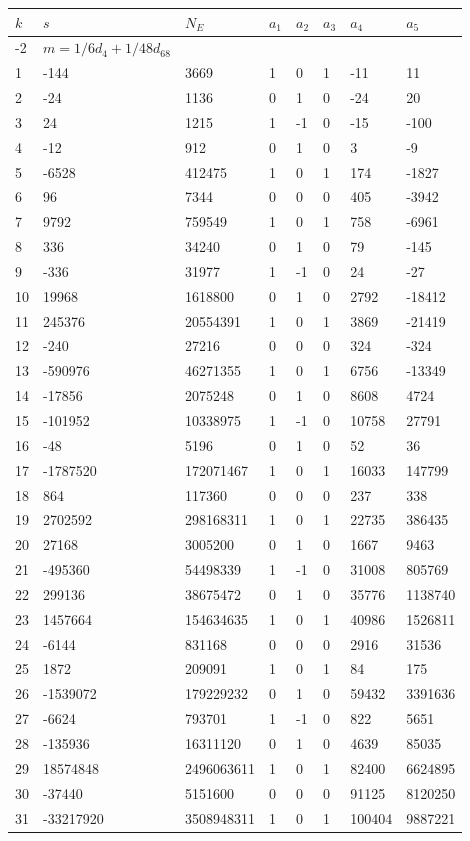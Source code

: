 \documentclass{amsart}
\begin{document}
\begin{longtable}{|l|l|l|lllll|}
\hline
$k$ & $s$ & $N_E$ & $a_1$ & $a_2$ & $a_3$ & $a_4$ & $a_5$\\
\hline
-2&$m=1/6d_{4}+1/48d_{68}$&&\multicolumn{5}{c|}{}\\
1&-144&3669&1&0&1&-11&11\\
2&-24&1136&0&1&0&-24&20\\
3&24&1215&1&-1&0&-15&-100\\
4&-12&912&0&1&0&3&-9\\
5&-6528&412475&1&0&1&174&-1827\\
6&96&7344&0&0&0&405&-3942\\
7&9792&759549&1&0&1&758&-6961\\
8&336&34240&0&1&0&79&-145\\
9&-336&31977&1&-1&0&24&-27\\
10&19968&1618800&0&1&0&2792&-18412\\
11&245376&20554391&1&0&1&3869&-21419\\
12&-240&27216&0&0&0&324&-324\\
13&-590976&46271355&1&0&1&6756&-13349\\
14&-17856&2075248&0&1&0&8608&4724\\
15&-101952&10338975&1&-1&0&10758&27791\\
16&-48&5196&0&1&0&52&36\\
17&-1787520&172071467&1&0&1&16033&147799\\
18&864&117360&0&0&0&237&338\\
19&2702592&298168311&1&0&1&22735&386435\\
20&27168&3005200&0&1&0&1667&9463\\
21&-495360&54498339&1&-1&0&31008&805769\\
22&299136&38675472&0&1&0&35776&1138740\\
23&1457664&154634635&1&0&1&40986&1526811\\
24&-6144&831168&0&0&0&2916&31536\\
25&1872&209091&1&0&1&84&175\\
26&-1539072&179229232&0&1&0&59432&3391636\\
27&-6624&793701&1&-1&0&822&5651\\
28&-135936&16311120&0&1&0&4639&85035\\
29&18574848&2496063611&1&0&1&82400&6624895\\
30&-37440&5151600&0&0&0&91125&8120250\\
31&-33217920&3508948311&1&0&1&100404&9887221\\

\end{longtable}
\end{document}
